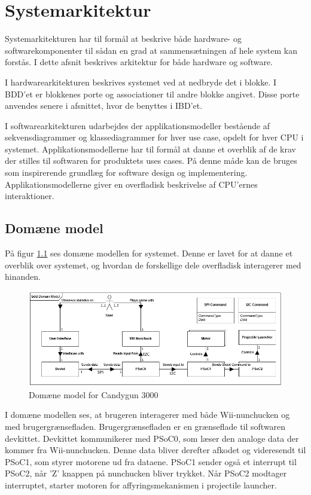 \chapter{Systemarkitektur}
Systemarkitekturen har til formål at beskrive både hardware- og softwarekomponenter til sådan en grad at sammensætningen af hele system kan forstås. I dette afsnit beskrives arkitektur for både hardware og software.

I hardwarearkitekturen beskrives systemet ved at nedbryde det i blokke. I BDD'et er blokkenes porte og associationer til andre blokke angivet. Disse porte anvendes senere i afsnittet, hvor de benyttes i IBD'et.

I softwarearkitekturen udarbejdes der applikationsmodeller bestående af sekvensdiagrammer og klassediagrammer for hver use case, opdelt for hver CPU i systemet. Applikationsmodellerne har til formål at danne et overblik af de krav der stilles til softwaren for produktets uses cases. På denne måde kan de bruges som inspirerende grundlæg for software design og implementering. Applikationsmodellerne giver en overfladisk beskrivelse af CPU'ernes interaktioner.

\section{Domæne model}
På figur \ref{fig:DomainModel} ses domæne modellen for systemet. Denne er lavet for at danne et overblik over systemet, og hvordan de forskellige dele overfladisk interagerer med hinanden. 

\begin{figure}[H]
	\centering
	\includegraphics[width=\textwidth]{Systemarkitektur/images/DomainModel}
	\caption{Domæne model for Candygun 3000}
	\label{fig:DomainModel}
\end{figure}

I domæne modellen ses, at brugeren interagerer med både Wii-nunchucken og med brugergrænsefladen. Brugergrænsefladen er en grænseflade til softwaren devkittet. Devkittet kommunikerer med PSoC0, som læser den analoge data der kommer fra Wii-nunchucken. Denne data bliver derefter afkodet og videresendt til PSoC1, som styrer motorene ud fra dataene. PSoC1 sender også et interrupt til PSoC2, når 'Z' knappen på nunchucken bliver trykket. Når PSoC2 modtager interruptet, starter motoren for affyringsmekanismen i projectile launcher.


